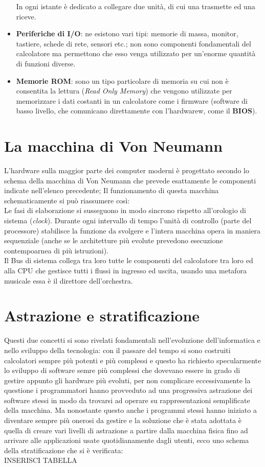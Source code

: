 \begin{itemize}
	In ogni istante è dedicato a collegare due unità, di cui una trasmette ed una riceve.
	\item\textbf{Periferiche di I/O}: ne esistono vari tipi: memorie di massa, monitor, tastiere, schede di rete, sensori etc.; non sono componenti fondamentali del calcolatore  ma permettono che esso venga utilizzato per un'enorme quantità di funzioni diverse.
	\item\textbf{Memorie ROM}: sono un tipo particolare di memoria su cui non è consentita la lettura (\textit{Read Only Memory}) che vengono utilizzate per memorizzare i dati costanti in un calcolatore come i firmware (software di basso livello, che comunicano direttamente con l'hardwarew, come il \textbf{BIOS}).
	
\end{itemize}

\section{La macchina di Von Neumann}
L’hardware sulla maggior parte dei computer moderni è progettato secondo lo schema della macchina di Von Neumann che prevede esattamente le componenti indicate nell'elenco precedente; Il funzionamento di questa macchina schematicamente si può riassumere così:\\
Le fasi di elaborazione si susseguono in modo sincrono rispetto all'orologio di sistema (\textit{clock}). Durante ogni intervallo di tempo l’unità di controllo (parte del processore) stabilisce la funzione da svolgere e l’intera macchina opera in maniera sequenziale (anche se le architetture più evolute prevedono esecuzione contempoarnea di più istruzioni).\\
Il Bus di sistema collega tra loro tutte le componenti del calcolatore tra loro ed alla CPU che gestisce tutti i flussi in ingresso ed uscita, usando una metafora musicale essa è il direttore dell'orchestra.

\section{Astrazione e stratificazione}
Questi due concetti si sono rivelati fondamentali nell'evoluzione dell'informatica e nello sviluppo della tecnologia: con il passare del tempo si sono costruiti calcolatori sempre più potenti e più complessi e questo ha richiesto specularmente lo sviluppo di software semre più complessi che dovevano essere in grado di gestire appunto gli hardware più evoluti, per non complicare eccessivamente la questione i programmatori hanno provveduto ad una progressiva astrazione dei software stessi in modo da trovarsi ad operare su rappresentazioni semplificate della macchina. Ma nonostante questo anche i programmi stessi hanno iniziato a diventare sempre più onerosi da gestire e la soluzione che è stata adottata è quella di creare vari livelli di astrazione a partire dalla macchina fisica fino ad arrivare alle applicazioni usate quotidianamente dagli utenti, ecco uno schema della stratificazione che si è verificata: 
\\INSERISCI TABELLA\\

